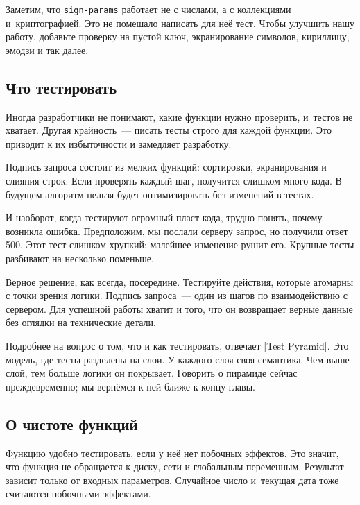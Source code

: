 \fi

Заметим, что \verb|sign-params| работает не с числами, а с коллекциями
и~криптографией. Это не помешало написать для неё тест. Чтобы улучшить нашу
работу, добавьте проверку на пустой ключ, экранирование символов, кириллицу,
эмодзи и так далее.

\subsection{Что тестировать}

Иногда разработчики не понимают, какие функции нужно проверить, и~тестов не
хватает. Другая крайность~--- писать тесты строго для каждой функции. Это
приводит к их избыточности и замедляет разработку.

Подпись запроса состоит из мелких функций: сортировки, экранирования и слияния
строк. Если проверять каждый шаг, получится слишком много кода. В будущем
алгоритм нельзя будет оптимизировать без изменений в тестах.

И наоборот, когда тестируют огромный пласт кода, трудно понять, почему возникла
ошибка. Предположим, мы послали серверу запрос, но получили ответ 500. Этот тест
слишком хрупкий: малейшее изменение рушит его. Крупные тесты разбивают на
несколько поменьше.

Верное решение, как всегда, посередине. Тестируйте действия, которые атомарны с
точки зрения логики. Подпись запроса~--- один из шагов по взаимодействию с
сервером. Для успешной работы хватит и того, что он возвращает верные данные без
оглядки на технические детали.


Подробнее на вопрос о том, что и как тестировать, отвечает
[Test Pyramid].
Это модель, где тесты разделены на слои. У каждого слоя своя семантика. Чем выше
слой, тем больше логики он покрывает. Говорить о пирамиде сейчас преждевременно; мы
вернёмся к ней ближе к концу главы.

\subsection{О чистоте функций}


Функцию удобно тестировать, если у неё нет побочных эффектов. Это значит, что
функция не обращается к диску, сети и глобальным переменным. Результат зависит
только от входных параметров. Случайное число и~текущая дата тоже считаются
побочными эффектами.

